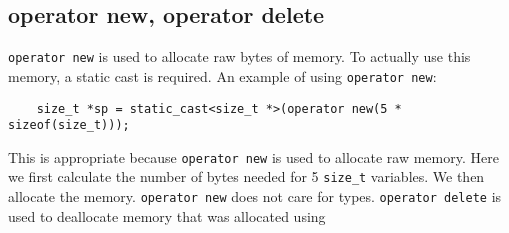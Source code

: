 \subsection*{operator new, operator delete}
\texttt{operator new} is used to allocate raw bytes of memory. To actually use this memory, a static cast is required. An example of using \texttt{operator new}:
    \begin{verbatim}
    size_t *sp = static_cast<size_t *>(operator new(5 * sizeof(size_t)));
    \end{verbatim}
    This is appropriate because \texttt{operator new} is used to allocate raw memory.
    Here we first calculate the number of bytes needed for 5 \texttt{size_t} variables. We then allocate the memory. \texttt{operator new} does not care for types.
    \texttt{operator delete} is used to deallocate memory that was allocated using \text
    
    \begin{verbatim}
     
    \end{verbatim}
